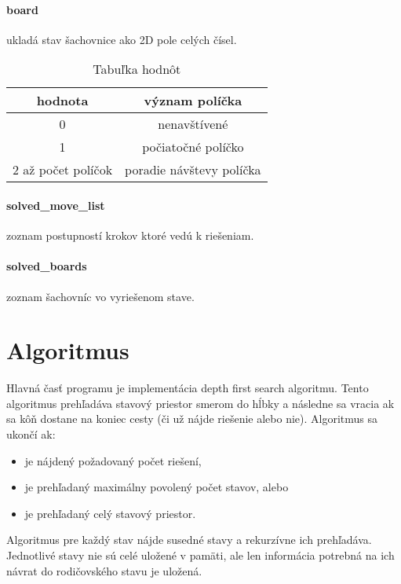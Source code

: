 \paragraph{board}\label{par:board} ukladá stav šachovnice ako 2D pole celých čísel.
\begin{table}[!ht]
    \centering
    \caption{Tabuľka hodnôt}
    \label{tab:tabuľka-hodnôt}
    \begin{tabular}{cc}
        \toprule
        hodnota            & význam políčka           \\ \midrule
        0                  & nenavštívené             \\
        1                  & počiatočné políčko       \\
        2 až počet políčok & poradie návštevy políčka \\ \bottomrule
    \end{tabular}
\end{table}

\paragraph{solved\_move\_list}\label{par:solved-move-list} zoznam postupností
krokov ktoré vedú k riešeniam.

\paragraph{solved\_boards} zoznam šachovníc vo vyriešenom stave.


\section{Algoritmus}\label{sec:algoritmus}

Hlavná časť programu je implementácia depth first search algoritmu.
Tento algoritmus prehľadáva stavový priestor smerom do hĺbky a následne sa vracia
ak sa kôň dostane na koniec cesty (či už nájde riešenie alebo nie).
Algoritmus sa ukončí ak:
\begin{itemize}
    \item je nájdený požadovaný počet riešení,
    \item je prehľadaný maximálny povolený počet stavov, alebo
    \item je prehľadaný celý stavový priestor.
\end{itemize}

Algoritmus pre každý stav nájde susedné stavy a rekurzívne ich prehľadáva.
Jednotlivé stavy nie sú celé uložené v pamäti, ale len informácia potrebná na
ich návrat do rodičovského stavu je uložená.


